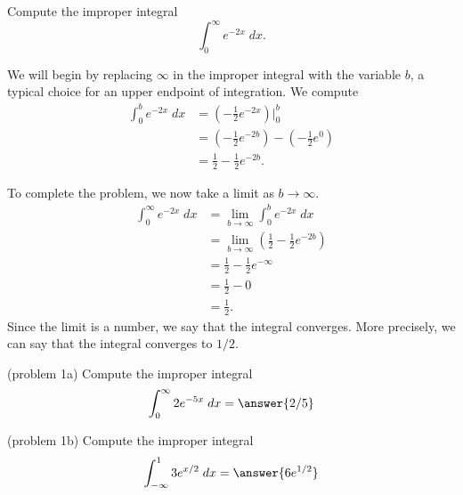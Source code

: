 \documentclass[handout]{ximera}
\begin{document}
\begin{example}[example 1]
Compute the improper integral
\[
\int_0^\infty e^{-2x} \; dx.
\]

We will begin by replacing $\infty$ in the improper integral with the variable $b$, a typical choice for an upper endpoint of integration.
We compute
\begin{align*}
\int_0^b e^{-2x} \; dx &= \left(-\frac12 e^{-2x} \right) \bigg|_0^b\\
                       &= \left(-\frac12 e^{-2b} \right) - \left(-\frac12 e^{0} \right)\\
                       &=\frac12 -\frac12 e^{-2b}.
\end{align*}
                       
To complete the problem, we now take a limit as $b \to \infty$.
\begin{align*}
\int_0^\infty e^{-2x} \; dx &= \lim_{b \to \infty}\int_0^b e^{-2x} \; dx\\
                       &=\lim_{b \to \infty} \left(\frac12 -\frac12 e^{-2b}\right)\\
                       &= \frac12 -\frac12 e^{-\infty}\\
                       &= \frac12 - 0 \\
                       &= \frac12.
\end{align*}
Since the limit is a number, we say that the integral converges.
More precisely, we can say that the integral converges to $1/2$.

\end{example}




\begin{problem}(problem 1a)
Compute the improper integral
\[
\int_0^\infty 2e^{-5x} \; dx = \answer{2/5}
\]
\begin{multipleChoice}
\end{multipleChoice}
\end{problem}


\begin{problem}(problem 1b)
Compute the improper integral
\[
\int_{-\infty}^1 3e^{x/2} \; dx = \answer{6e^{1/2}}
\]
\begin{multipleChoice}
\end{multipleChoice}
\end{problem}
\end{document}
